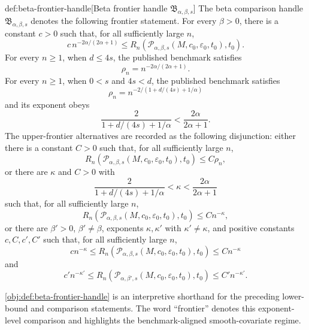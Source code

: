 \begin{remarkv}{def:beta-frontier-handle}[Beta frontier handle $\mathfrak B_{\alpha,\beta,s}$]
The beta comparison handle \(\mathfrak B_{\alpha,\beta,s}\) denotes the following frontier statement. For every \(\beta>0\), there is a constant \(c>0\) such that, for all sufficiently large \(n\),
\[
c\,n^{-2\alpha/(2\alpha+1)}
\le
R_n\!\left(\mathcal P_{\alpha,\beta,s}(M,c_0,\varepsilon_0,t_0),t_0\right).
\]
For every \(n\ge 1\), when \(d\le 4s\), the published benchmark satisfies
\[
\rho_n
=
n^{-2\alpha/(2\alpha+1)}.
\]
For every \(n\ge 1\), when \(0<s\) and \(4s<d\), the published benchmark satisfies
\[
\rho_n
=
n^{-2/(1+d/(4s)+1/\alpha)}
\]
and its exponent obeys
\[
\frac{2}{1+d/(4s)+1/\alpha}
<
\frac{2\alpha}{2\alpha+1}.
\]
The upper-frontier alternatives are recorded as the following disjunction: either there is a constant \(C>0\) such that, for all sufficiently large \(n\),
\[
R_n\!\left(\mathcal P_{\alpha,\beta,s}(M,c_0,\varepsilon_0,t_0),t_0\right)
\le
C\rho_n,
\]
or there are \(\kappa\) and \(C>0\) with
\[
\frac{2}{1+d/(4s)+1/\alpha}<\kappa<\frac{2\alpha}{2\alpha+1}
\]
such that, for all sufficiently large \(n\),
\[
R_n\!\left(\mathcal P_{\alpha,\beta,s}(M,c_0,\varepsilon_0,t_0),t_0\right)
\le
C n^{-\kappa},
\]
or there are \(\beta'>0\), \(\beta'\ne\beta\), exponents \(\kappa,\kappa'\) with \(\kappa'\ne\kappa\), and positive constants \(c,C,c',C'\) such that, for all sufficiently large \(n\),
\[
c n^{-\kappa}
\le
R_n\!\left(\mathcal P_{\alpha,\beta,s}(M,c_0,\varepsilon_0,t_0),t_0\right)
\le
C n^{-\kappa}
\]
and
\[
c' n^{-\kappa'}
\le
R_n\!\left(\mathcal P_{\alpha,\beta',s}(M,c_0,\varepsilon_0,t_0),t_0\right)
\le
C' n^{-\kappa'}.
\]
\end{remarkv}

\cref{obj:def:beta-frontier-handle} is an interpretive shorthand for the preceding lower-bound and comparison statements. The word ``frontier'' denotes this exponent-level comparison and highlights the benchmark-aligned smooth-covariate regime.
